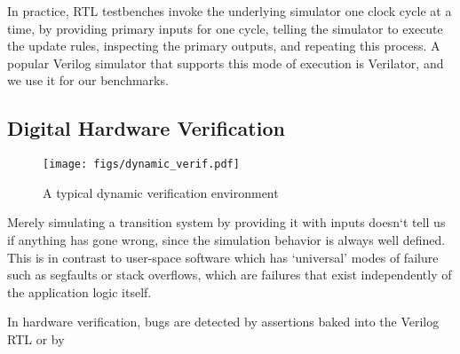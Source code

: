 \documentclass[sigconf,noacm]{acmart}
\begin{document}
In practice, RTL testbenches invoke the underlying simulator one clock cycle at a time, by providing primary inputs for one cycle, telling the simulator to execute the update rules, inspecting the primary outputs, and repeating this process.
A popular Verilog simulator that supports this mode of execution is Verilator, and we use it for our benchmarks.

\subsection{Digital Hardware Verification}

\begin{figure}
  \texttt{[image: figs/dynamic\_verif.pdf]}
  \caption{A typical dynamic verification environment}
  \label{fig:dynamic_verif}
\end{figure}

Merely simulating a transition system by providing it with inputs doesn`t tell us if anything has gone wrong, since the simulation behavior is always well defined.
This is in contrast to user-space software which has `universal' modes of failure such as segfaults or stack overflows, which are failures that exist independently of the application logic itself.

In hardware verification, bugs are detected by assertions baked into the Verilog RTL or by 





\appendix
\end{document}
